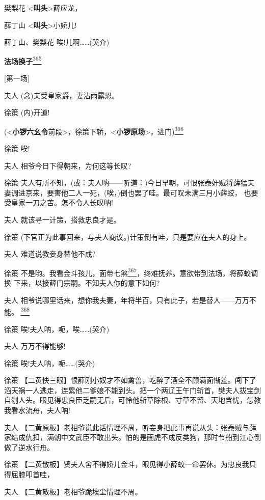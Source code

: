 樊梨花 \textless{}\textbf{叫头}\textgreater{}薛应龙，

薛丁山 \textless{}\textbf{叫头}\textgreater{}小娇儿!

薛丁山、樊梨花 唉!儿啊\ldots{}\ldots{}(哭介)

\textbf{法场换子}\protect\hyperlink{fn365}{\textsuperscript{365}}

{[}第一场{]}

夫人 (念)夫受皇家爵，妻沾雨露恩。

徐策 (内)开道!

(\textless{}\textbf{小锣六幺令}前段\textgreater{}，徐策下轿，\textless{}\textbf{小锣原场}\textgreater{}，进门)\protect\hyperlink{fn366}{\textsuperscript{366}}

徐策 唉!

夫人 相爷今日下得朝来，为何这等长叹?

徐策
夫人有所不知，(或：夫人呐------听道：)今日早朝，可恨张泰奸贼将薛猛夫
妻调进京来，要害他二人一死，(唉，)倒也罢了哇。最可叹未满三月小薛蛟，
也要受皇家一刀之苦。怎不令人长叹呐!

夫人 就该寻一计策，搭救忠良才是。

徐策 (下官正为此事回来，与夫人商议。)计策倒有哇，只是要应在夫人的身上。

夫人 难道说教妾身替他不成?

徐策
不是哟。我看金斗孩儿，面带七煞\protect\hyperlink{fn367}{\textsuperscript{367}}，终难抚养。意欲带到法场，将薛蛟调换
下来，以接薛门宗嗣。不知夫人你的意下如何?

夫人
相爷说哪里话来，想你我夫妻，年将半百，只有此子，若是替人------万万不能。
\protect\hyperlink{fn368}{\textsuperscript{368}}

徐策 唉!夫人呐，呃，唉\ldots{}\ldots{}(哭介)

夫人 万万不得能够!

徐策 唉!夫人呐，呃\ldots{}\ldots{}(哭介)

徐策
【二黄快三眼】恨薛刚小奴才不如禽兽，吃醉了酒全不顾满面惭羞。闯下了滔天祸一人逃走，连累他二爹娘不能到头。把一个两辽王午门斩首，樊夫人拔宝剑自刎人头。眼见得忠良臣乏嗣无后，可怜他斩草除根、寸草不留、天地含忧，怎教我看水流舟，夫人呐!

夫人
【二黄原板】老相爷说此话情理不周，听妾身把此事再说从头：张泰贼与薛家结成仇扣，满朝中文武臣不敢出头。怕的是画虎不成反类狗，那时节船到江心倒做了逆水行舟。

徐策
【二黄散板】贤夫人舍不得娇儿金斗，眼见得小薛蛟一命罢休。为忠良我只得屈膝叩首哇，

夫人 【二黄散板】老相爷跪埃尘情理不周。

